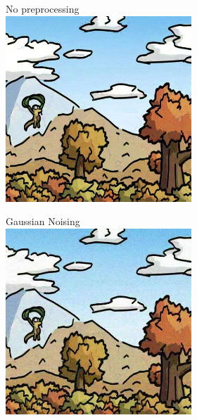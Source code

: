\documentclass{article}
\begin{document}
\begin{figure}[h]
    \centering
    \begin{subfigure}[t]{\textwidth}
        \begin{subfigure}[b]{0.24\textwidth}
         \centering
         No preprocessing\vspace{0.3em}
         \includegraphics[width=\textwidth]{plots/process/glaze/0009.jpg}
     \end{subfigure}
     \hfill
     \begin{subfigure}[b]{0.24\textwidth}
         \centering
         Gaussian Noising\vspace{0.3em}
         \includegraphics[width=\textwidth]{plots/process/preprocess/glaze/gaussian.jpg}

\end{subfigure}
\end{subfigure}
\end{figure}
\end{document}
